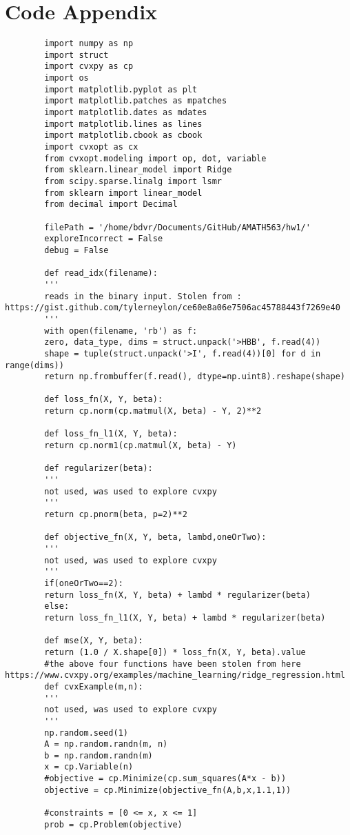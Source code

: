 \documentclass[12pt]{article}
\begin{document}
	\section{Code Appendix}
	\begin{verbatim}
		import numpy as np
		import struct
		import cvxpy as cp
		import os
		import matplotlib.pyplot as plt
		import matplotlib.patches as mpatches
		import matplotlib.dates as mdates
		import matplotlib.lines as lines
		import matplotlib.cbook as cbook
		import cvxopt as cx
		from cvxopt.modeling import op, dot, variable
		from sklearn.linear_model import Ridge
		from scipy.sparse.linalg import lsmr
		from sklearn import linear_model
		from decimal import Decimal
		
		filePath = '/home/bdvr/Documents/GitHub/AMATH563/hw1/'
		exploreIncorrect = False
		debug = False
		
		def read_idx(filename):
		'''
		reads in the binary input. Stolen from : https://gist.github.com/tylerneylon/ce60e8a06e7506ac45788443f7269e40
		'''
		with open(filename, 'rb') as f:
		zero, data_type, dims = struct.unpack('>HBB', f.read(4))
		shape = tuple(struct.unpack('>I', f.read(4))[0] for d in range(dims))
		return np.frombuffer(f.read(), dtype=np.uint8).reshape(shape)
		
		def loss_fn(X, Y, beta):
		return cp.norm(cp.matmul(X, beta) - Y, 2)**2
		
		def loss_fn_l1(X, Y, beta):
		return cp.norm1(cp.matmul(X, beta) - Y)
		
		def regularizer(beta):
		'''
		not used, was used to explore cvxpy
		'''
		return cp.pnorm(beta, p=2)**2
		
		def objective_fn(X, Y, beta, lambd,oneOrTwo):
		'''
		not used, was used to explore cvxpy
		'''
		if(oneOrTwo==2):
		return loss_fn(X, Y, beta) + lambd * regularizer(beta)
		else:
		return loss_fn_l1(X, Y, beta) + lambd * regularizer(beta)
		
		def mse(X, Y, beta):
		return (1.0 / X.shape[0]) * loss_fn(X, Y, beta).value
		#the above four functions have been stolen from here https://www.cvxpy.org/examples/machine_learning/ridge_regression.html
		def cvxExample(m,n):
		'''
		not used, was used to explore cvxpy
		'''
		np.random.seed(1)
		A = np.random.randn(m, n)
		b = np.random.randn(m)
		x = cp.Variable(n)
		#objective = cp.Minimize(cp.sum_squares(A*x - b))
		objective = cp.Minimize(objective_fn(A,b,x,1.1,1))
		
		#constraints = [0 <= x, x <= 1]
		prob = cp.Problem(objective)
		

\end{verbatim}
\end{document}
